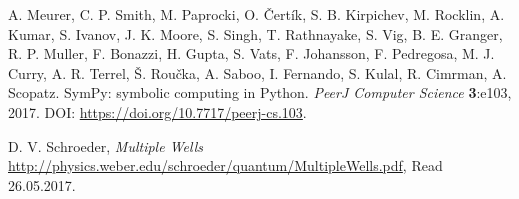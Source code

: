 \documentclass[../main.tex]{subfiles}
\begin{document}
\begin{thebibliography}{99}
 A. Meurer, C. P. Smith, M. Paprocki, O. Čertík, S. B. Kirpichev, M. Rocklin, A. Kumar, S. Ivanov, J. K. Moore, S. Singh, T. Rathnayake, S. Vig, B. E. Granger, R. P. Muller, F. Bonazzi, H. Gupta, S. Vats, F. Johansson, F. Pedregosa, M. J. Curry, A. R. Terrel, Š. Roučka, A. Saboo, I. Fernando, S. Kulal, R. Cimrman, A. Scopatz. SymPy: symbolic computing in Python. \emph{PeerJ Computer Science} \textbf{3}:e103, 2017. DOI: \url{https://doi.org/10.7717/peerj-cs.103}.

 D. V. Schroeder, \emph{Multiple Wells} \url{http://physics.weber.edu/schroeder/quantum/MultipleWells.pdf}, Read 26.05.2017.



\end{thebibliography}
\end{document}
